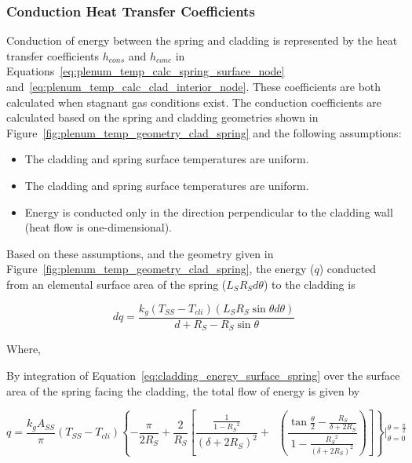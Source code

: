 \subsubsection{Conduction Heat Transfer Coefficients}\label{conduction-heat-transfer-coefficients}

Conduction of energy between the spring and cladding is represented by the heat transfer
coefficients \(h_{cons}\) and \(h_{conc}\) in
Equations~\ref{eq:plenum_temp_calc_spring_surface_node}
and~\ref{eq:plenum_temp_calc_clad_interior_node}. These coefficients are both calculated when
stagnant gas conditions exist. The conduction coefficients are calculated based on the spring and
cladding geometries shown in Figure~\ref{fig:plenum_temp_geometry_clad_spring} and the following
assumptions:
\begin{itemize}

    \item The cladding and spring surface temperatures are uniform.

    \item The cladding and spring surface temperatures are uniform.
    
    \item Energy is conducted only in the direction perpendicular to the cladding wall (heat flow is
        one-dimensional).
        
\end{itemize}

Based on these assumptions, and the geometry given in
Figure~\ref{fig:plenum_temp_geometry_clad_spring}, the energy (\(q\)) conducted from an elemental
surface area of the spring (\(L_{S}R_{S}d \theta\)) to the cladding is

\begin{equation}
    \label{eq:cladding_energy_surface_spring}
    dq = \frac{k_{g}\left( T_{SS} - T_{cli} \right)\left( L_{S}R_{S}\sin \theta d\theta \right)}{d + R_{S} - R_{S}\sin \theta }
\end{equation}

Where,

By integration of Equation~\ref{eq:cladding_energy_surface_spring} over the surface area of the
spring facing the cladding, the total flow of energy is given by

\begin{equation}
    \label{eq:plenum_total_energy_flow}
    q = \frac{k_{g}A_{SS}}{\pi}\left( T_{SS} - T_{cli} \right)
        \left\{ - \frac{\pi}{2R_{S}} + \frac{2}{R_{S}}\left[\frac{\frac{1}{1 - {R_{S}}^{2}}}{\left( \delta + 2R_{S} \right)^{2}} + \operatorname{}\left( \frac{\tan\frac{\theta}{2} - \frac{R_{S}}{\delta + 2R_{S}}}{1 - \frac{{R_{S}}^{2}}{\left( \delta + 2R_{S} \right)^{2}}} \right) \right] \right\} \Bigg \vert_{\theta = 0}^{\theta = \frac{\pi}{2}}
\end{equation}

